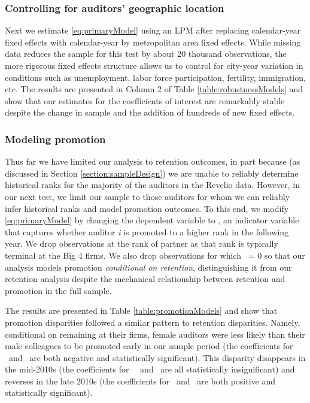 \documentclass[11pt]{article}
\begin{document}
        \subsubsection{Controlling for auditors' geographic location}\label{section:locationControls}
            Next we estimate \ref{eq:primaryModel} using an LPM after replacing calendar-year fixed effects with calendar-year by metropolitan area fixed effects. While missing data reduces the sample for this test by about 20 thousand observations, the more rigorous fixed effects structure allows us to control for city-year variation in conditions such as unemployment, labor force participation, fertility, immigration, etc. The results are presented in Column 2 of Table \ref{table:robustnessModels} and show that our estimates for the coefficients of interest are remarkably stable despite the change in sample and the addition of hundreds of new fixed effects. 

        \subsubsection{Modeling promotion}\label{section:promotionModel}
            Thus far we have limited our analysis to retention outcomes, in part because (as discussed in Section \ref{section:sampleDesign}) we are unable to reliably determine historical ranks for the majority of the auditors in the Revelio data. However, in our next test, we limit our sample to those auditors for whom we can reliably infer historical ranks and model promotion outcomes. To this end, we modify \ref{eq:primaryModel} by changing the dependent variable to \PROMOTED, an indicator variable that captures whether auditor \textit{i} is promoted to a higher rank in the following year. We drop observations at the rank of partner as that rank is typically terminal at the Big 4 firms. We also drop observations for which \RETAINED\ = 0 so that our analysis models promotion \textit{conditional on retention}, distinguishing it from our retention analysis despite the mechanical relationship between retention and promotion in the full sample.  
            
            The results are presented in Table \ref{table:promotionModels} and show that promotion disparities followed a similar pattern to retention disparities. Namely, conditional on remaining at their firms, female auditors were less likely than their male colleagues to be promoted early in our sample period (the coefficients for \FEMALExPREX\ and \FEMALExXtoXI\ are both negative and statistically significant). This disparity disappears in the mid-2010s (the coefficients for \FEMALExXIItoXIII\, \FEMALExXIVtoXV\ and \FEMALExXVItoXVII\ are all statistically insignificant) and reverses in the late 2010s (the coefficients for \FEMALExXVIIItoXIX\ and \FEMALExPOSTXIX\ are both positive and statistically significant).
            
\end{document}
